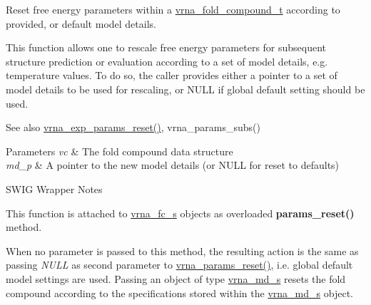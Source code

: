 Reset free energy parameters within a \hyperlink{group__fold__compound_ga1b0cef17fd40466cef5968eaeeff6166}{vrna\+\_\+fold\+\_\+compound\+\_\+t} according to provided, or default model details. 

This function allows one to rescale free energy parameters for subsequent structure prediction or evaluation according to a set of model details, e.\+g. temperature values. To do so, the caller provides either a pointer to a set of model details to be used for rescaling, or N\+U\+LL if global default setting should be used.

\begin{DoxySeeAlso}{See also}
\hyperlink{group__energy__parameters_gaa5409218068be84d7b50c78fbdaa85a9}{vrna\+\_\+exp\+\_\+params\+\_\+reset()}, vrna\+\_\+params\+\_\+subs() 
\end{DoxySeeAlso}

\begin{DoxyParams}{Parameters}
{\em vc} & The fold compound data structure \\
\hline
{\em md\+\_\+p} & A pointer to the new model details (or N\+U\+LL for reset to defaults)\\
\hline
\end{DoxyParams}
\begin{DoxyRefDesc}{S\+W\+I\+G Wrapper Notes}
\item[\hyperlink{wrappers__wrappers000052}{S\+W\+I\+G Wrapper Notes}]This function is attached to \hyperlink{group__fold__compound_structvrna__fc__s}{vrna\+\_\+fc\+\_\+s} objects as overloaded {\bfseries params\+\_\+reset()} method.

When no parameter is passed to this method, the resulting action is the same as passing {\itshape N\+U\+LL} as second parameter to \hyperlink{group__energy__parameters_gac40dc82e48a72a97cfc58b9da08a7792}{vrna\+\_\+params\+\_\+reset()}, i.\+e. global default model settings are used. Passing an object of type \hyperlink{group__model__details_structvrna__md__s}{vrna\+\_\+md\+\_\+s} resets the fold compound according to the specifications stored within the \hyperlink{group__model__details_structvrna__md__s}{vrna\+\_\+md\+\_\+s} object. \end{DoxyRefDesc}
\mbox{\label{group__energy__parameters_gaa5409218068be84d7b50c78fbdaa85a9}} 
